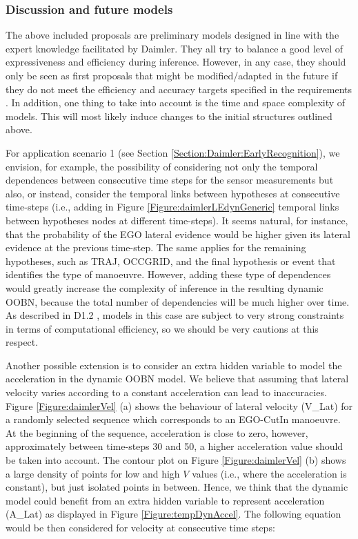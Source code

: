 \subsubsection{Discussion and future models}\label{subsubsection:daimlerfuture}

The above included proposals are preliminary models designed in line with the expert knowledge facilitated by Daimler. They all try to balance a good level of expressiveness and efficiency during inference. However, in any case, they should only be seen as first proposals that might be modified/adapted in the future if they do not meet the efficiency and accuracy targets specified in the requirements \cite{Fer14}. In addition, one thing to take into account is the time and space complexity of models. This will most likely induce changes to the initial structures outlined above.

For application scenario 1 (see Section \ref{Section:Daimler:EarlyRecognition}), we envision, for example, the possibility of considering not only the temporal dependences between consecutive time steps for the sensor measurements but also, or instead, consider the temporal links between hypotheses at consecutive time-steps (i.e., adding in Figure \ref{Figure:daimlerLEdynGeneric} temporal links between hypotheses nodes at different time-steps). It seems natural, for instance, that the probability of the EGO lateral evidence would be higher given its lateral evidence at the previous time-step. The same applies for the remaining hypotheses, such as TRAJ, OCCGRID, and the final hypothesis or event that identifies the type of manoeuvre. However, adding these type of dependences would greatly increase the complexity of inference in the resulting dynamic OOBN, because the total number of dependencies will be much higher over time. As described in D1.2 \cite{Fer14}, models in this case are subject to very strong constraints in terms of computational efficiency, so we should be very cautions at this respect. 

Another possible extension is to consider an extra hidden variable to model the acceleration in the dynamic OOBN model. We believe that assuming that lateral velocity varies according to a constant acceleration can lead to inaccuracies. Figure \ref{Figure:daimlerVel} (a) shows the behaviour of lateral velocity (V\_Lat) for a randomly selected sequence which corresponds to an EGO-CutIn manoeuvre. At the beginning of the sequence, acceleration is close to zero, however, approximately between time-steps 30 and 50, a higher acceleration value should be taken into account. The contour plot on Figure \ref{Figure:daimlerVel} (b) shows a large density of points for low and high $V$ values (i.e., where the acceleration is constant), but just isolated points in between. Hence, we think that the dynamic model could benefit from an extra hidden variable to represent acceleration (A\_Lat) as displayed in Figure \ref{Figure:tempDynAccel}. The following equation would be then considered for velocity at consecutive time steps:


